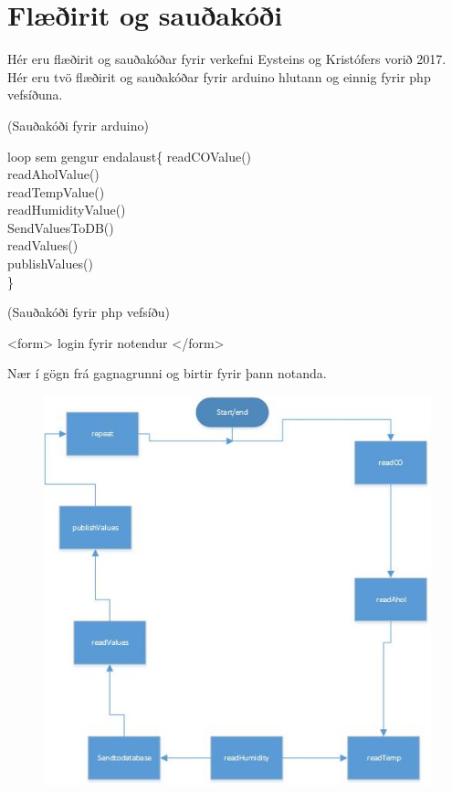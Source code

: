 \section{Flæðirit og sauðakóði} Hér eru flæðirit og sauðakóðar fyrir verkefni Eysteins og Kristófers vorið 2017.  Hér eru tvö flæðirit og sauðakóðar fyrir arduino hlutann og einnig fyrir php vefsíðuna.   
 
(Sauðakóði fyrir arduino)

loop sem gengur endalaust\{
  readCOValue()\\
  readAholValue()\\
  readTempValue()\\
  readHumidityValue()\\
  
  SendValuesToDB()\\
  readValues()\\
  publishValues()\\
\}

(Sauðakóði fyrir php vefsíðu)

<form>
login fyrir notendur
</form>

Nær í gögn frá gagnagrunni og birtir fyrir þann notanda.
 







\begin{figure}[h]
\includegraphics[scale=.3]{img/Fchatarduinomynd}
\end{figure}

